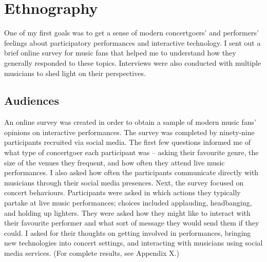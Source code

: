 \chapter{Ethnography}

One of my first goals was to get a sense of modern concertgoers' and performers' feelings about participatory performances and interactive technology. I sent out a brief online survey for music fans that helped me to understand how they generally responded to these topics. Interviews were also conducted with multiple musicians to shed light on their perspectives.

\section{Audiences}

An online survey was created in order to obtain a sample of modern music fans' opinions on interactive performances. The survey was completed by ninety-nine participants recruited via social media. The first few questions informed me of what type of concertgoer each participant was -- asking their favourite genre, the size of the venues they frequent, and how often they attend live music performances. I also asked how often the participants communicate directly with musicians through their social media presences. Next, the survey focused on concert behaviours. Participants were asked in which actions they typically partake at live music performances; choices included applauding, headbanging, and holding up lighters. They were asked how they might like to interact with their favourite performer and what sort of message they would send them if they could. I asked for their thoughts on getting involved in performances, bringing new technologies into concert settings, and interacting with musicians using social media services. (For complete results, see Appendix X.)

